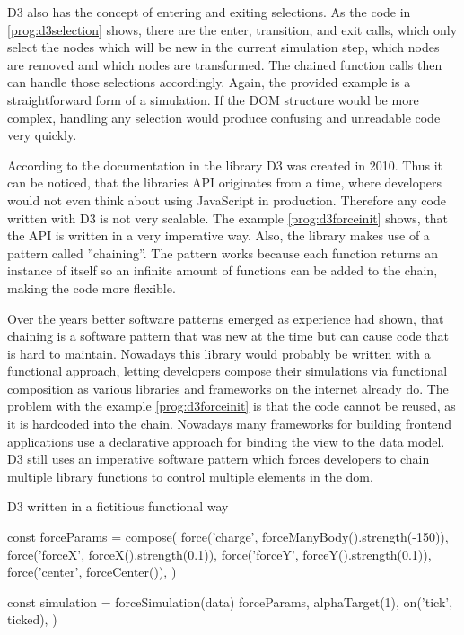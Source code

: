 D3 also has the concept of entering and exiting selections. As the code in \ref{prog:d3selection} shows, there are the enter, transition, and exit calls, which only select the nodes which will be new in the current simulation step, which nodes are removed and which nodes are transformed. The chained function calls then can handle those selections accordingly. Again, the provided example is a straightforward form of a simulation. If the DOM structure would be more complex, handling any selection would produce confusing and unreadable code very quickly.

According to the documentation in \cite{D3Github} the library D3 was created in 2010. Thus it can be noticed, that the libraries API originates from a time, where developers would not even think about using JavaScript in production. Therefore any code written with D3 is not very scalable. The example \ref{prog:d3forceinit} shows, that the API is written in a very imperative way. Also, the library makes use of a pattern called ''chaining''. The pattern works because each function returns an instance of itself so an infinite amount of functions can be added to the chain, making the code more flexible.

Over the years better software patterns emerged as experience had shown, that chaining is a software pattern that was new at the time but can cause code that is hard to maintain. Nowadays this library would probably be written with a functional approach, letting developers compose their simulations via functional composition as various libraries and frameworks on the internet already do. The problem with the example \ref{prog:d3forceinit} is that the code cannot be reused, as it is hardcoded into the chain. Nowadays many frameworks for building frontend applications use a declarative approach for binding the view to the data model. D3 still uses an imperative software pattern which forces developers to chain multiple library functions to control multiple elements in the dom.

\begin{program}
\caption{D3 written in a fictitious functional way}
\label{prog:d3functional}
\begin{JsCode}
const forceParams = compose(
  force('charge', forceManyBody().strength(-150)),
  force('forceX', forceX().strength(0.1)),
  force('forceY', forceY().strength(0.1)),
  force('center', forceCenter()),
)

const simulation = forceSimulation(data)
  forceParams,
  alphaTarget(1),
  on('tick', ticked),
)
\end{JsCode}
\end{program}

